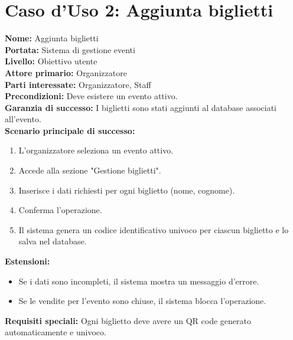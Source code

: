 \documentclass[a4paper,12pt]{article}
\begin{document}
\section*{\textcolor{sectioncolor}{Caso d'Uso 2: Aggiunta biglietti}}
\textcolor{textcolor}{
\textbf{Nome:} Aggiunta biglietti\\
\textbf{Portata:} Sistema di gestione eventi\\
\textbf{Livello:} Obiettivo utente\\
\textbf{Attore primario:} Organizzatore\\
\textbf{Parti interessate:} Organizzatore, Staff\\
\textbf{Precondizioni:} Deve esistere un evento attivo.\\
\textbf{Garanzia di successo:} I biglietti sono stati aggiunti al database associati all'evento.\\
\textbf{Scenario principale di successo:}
\begin{enumerate}
    \item L'organizzatore seleziona un evento attivo.
    \item Accede alla sezione "Gestione biglietti".
    \item Inserisce i dati richiesti per ogni biglietto (nome, cognome).
    \item Conferma l'operazione.
    \item Il sistema genera un codice identificativo univoco per ciascun biglietto e lo salva nel database.
\end{enumerate}
\textbf{Estensioni:}
\begin{itemize}
    \item Se i dati sono incompleti, il sistema mostra un messaggio d'errore.
    \item Se le vendite per l'evento sono chiuse, il sistema blocca l'operazione.
\end{itemize}
\textbf{Requisiti speciali:} Ogni biglietto deve avere un QR code generato automaticamente e univoco.
}
\end{document}
